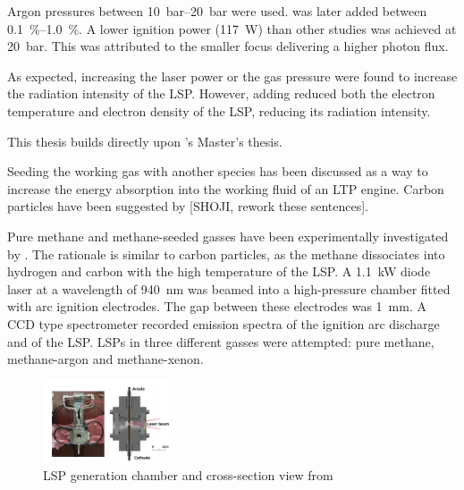         Argon pressures between \qtyrange{10}{20}{bar} were used.  was later added between \qtyrange{0.1}{1.0}{\%}. A lower ignition power (\qty{117}{W}) than other studies was achieved at \qty{20}{bar}. This was attributed to the smaller focus delivering a higher photon flux.
        
        As expected, increasing the laser power or the gas pressure were found to increase the radiation intensity of the LSP. However, adding  reduced both the electron temperature and electron density of the LSP, reducing its radiation intensity.


        This thesis builds directly upon \textcite{duplayArgonLaserPlasmaThruster2024a}'s Master's thesis. 



       

        



        Seeding the working gas with another species has been discussed as a way to increase the energy absorption into the working fluid of an LTP engine. Carbon particles have been suggested by [SHOJI, rework these sentences].

        Pure methane and methane-seeded gasses have been experimentally investigated by \textcite{kameiMethaneMethaneXenon2020}. The rationale is similar to carbon particles, as the methane dissociates into hydrogen and carbon with the high temperature of the LSP. A \qty{1.1}{kW} diode laser at a wavelength of \qty{940}{nm} was beamed into a high-pressure chamber fitted with arc ignition electrodes. The gap between these electrodes was \qty{1}{mm}. A CCD type spectrometer recorded emission spectra of the ignition arc discharge and of the LSP. LSPs in three different gasses were attempted: pure methane, methane-argon and methane-xenon.
        
        \begin{figure}[h]
            \centering
            \includegraphics[width=0.35\textwidth]{assets/2 background/Kamei apparatus.png}
            \caption{LSP generation chamber and cross-section view from \textcite{kameiMethaneMethaneXenon2020}}
            \label{fig:Kamei}
        \end{figure}

